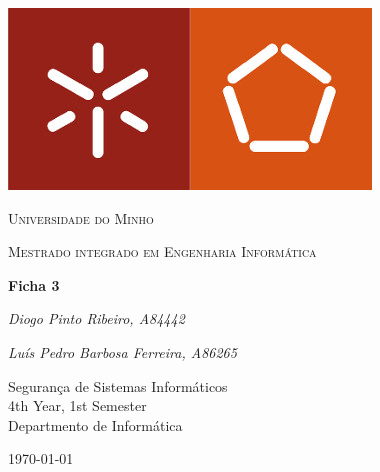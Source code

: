 \documentclass[12pt]{article}
\begin{document}
\thispagestyle{empty}
\setlength\headheight{0pt} 
\begin{center}

\begin{center}
\includegraphics[width=0.45\linewidth]{img/um_logo.jpg}            
\end{center}	

        \vspace{0.25cm}
        {\scshape\LARGE Universidade do Minho \par}
        \vspace{0.25cm}
        {\scshape\Large Mestrado integrado em Engenharia Informática\par}
        \vspace{0.5cm}

        {\Large\bfseries Ficha 3\par}
        
        \vspace{0.5cm}
        {\Large\itshape Diogo Pinto Ribeiro, A84442\par}
        {\Large\itshape Luís Pedro Barbosa Ferreira, A86265\par}
        \vspace{0.25cm}

\vspace{1cm}
Segurança de Sistemas Informáticos \\
4th Year, 1st Semester \\
Departmento de Informática\par
\vspace{1.5cm}
\large
\today

\end{center}

\clearpage
\restoregeometry
\justify

%
%
%

\renewcommand{\contentsname}{Contents}
\tableofcontents
\pagebreak

 








\printbibliography
\end{document}

